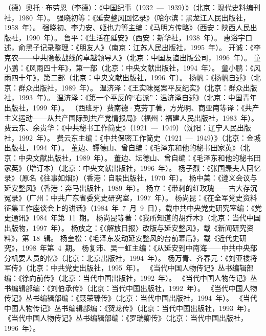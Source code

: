\begin{thebibliography}{999}
\bibitem{}（德）奥托·布劳恩（李德）：《中国纪事（1932~—~1939）》（北京：现代史料编刊社，1980~年）。
\bibitem{}强晓初等：《延安整风回忆录》（哈尔滨：黑龙江人民出版社，1958~年）。
\bibitem{}强晓初、李力安、姬也力等主编：《马明方传略》（西安：陕西人民出版社，1990~年）。
\bibitem{}鲁平：《生活在延安》（西安：新华社，1938~年）。
\bibitem{}惠浴宇口述，俞黑子记录整理：《朋友人》（南京：江苏人民出版社，1995~年）。
\bibitem{}开诚：《李克农——中共隐蔽战线的卓越领导人》（北京：中国友谊出版公司，1996~年）。
\bibitem{}童小鹏：《风雨四十年》，第一部（北京：中央文献出版社，1994~年）。
\bibitem{}童小鹏：《风雨四十年》，第二部（北京：中央文献出版社，1996~年）。
\bibitem{}扬帆：《扬帆自述》（北京：群众出版社，1989~年）。
\bibitem{}温济泽：《王实味冤案平反纪实》（北京：群众出版社，1993~年）。
\bibitem{}温济泽：《第一个平反的“右派”：温济泽自述》（北京：中国青年出版社，1999~年）。
\bibitem{}（西班牙）费南德·克劳丁著，方光明、商亚南等译：《共产主义运动——从共产国际到共产党情报局》（福州：福建人民出版社，1983~年）。
\bibitem{}费云东、余贵华：《中共秘书工作简史》（1921~—~1949）（沈阳：辽宁人民出版社，1992~年）。
\bibitem{}费云东主编：《中共保密工作简史（1921~—~1949）》（北京：金城出版社，1994~年）。
\bibitem{}董边、镡德山、曾自编：《毛泽东和他的秘书田家英》（北京：中央文献出版社，1989~年）。
\bibitem{}董边、坛德山、曾自编：《毛泽东和他的秘书田家英》（增订本）（北京：中央文献出版社，1996~年）。
\bibitem{}杨子烈：《张国焘夫人回忆录》（原名《往事如烟》）（香港：自联出版社，1970~年）。
\bibitem{}杨中美：《遵义会议与延安整风》（香港：奔马出版社，1989~年）。
\bibitem{}杨立：《带刺的红玫瑰——古大存沉冤录》（广州：中共广东省委党史研究室，1997~年）。
\bibitem{}杨尚昆：《在全军党史资料征集工作座谈会上的讲话》（1984~年~7~月~9~日），载中共中央党史研究室编：《党史通讯》1984~年第~11~期。
\bibitem{}杨尚昆等著：《我所知道的胡乔木》（北京：当代中国出版物，1997~年）。
\bibitem{}杨放之：《〈解放日报〉改版与延安整风》，载《新闻研究资料》，第~18~辑。
\bibitem{}杨奎松：《毛泽东发动延安整风的台前幕后》，载《近代史研究》，1998~年第~4~期。
\bibitem{}杨复沛、吴一虹主编：《从延安到中南海——中共中央部分机要人员的忆》（北京：北京出版社，1994~年）。
\bibitem{}杨万青、齐春元：《刘亚褛将军传》（北京：中共党史出版社，1995~年）。
\bibitem{}《当代中国人物传记》丛书编辑部编：《徐向前传》（北京：当代中国出版社，1992~年）。
\bibitem{}《当代中国人物传记》丛书编辑部编：《刘伯承传》（北京：当代中国出版社，1992~年）。
\bibitem{}《当代中国人物传记》丛书编辑部编：《聂荣臻传》（北京：当代中国出版社，1994~年）。
\bibitem{}《当代中国人物传记》丛书编辑部编：《贺龙传》（北京：当代中国出版社，1993~年）。
\bibitem{}《当代中国人物传记》丛书编辑部编：《罗瑞卿传》（北京：当代中国出版社，1996~年）。

\end{thebibliography}
